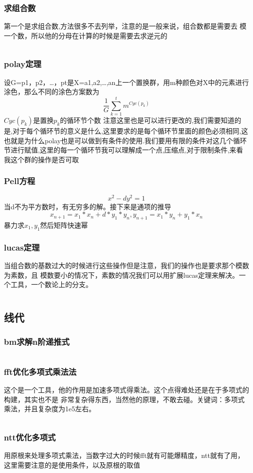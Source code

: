 \documentclass[a4paper,13.6pt]{article}
\begin{document}
\begin{CJK}{UTF8}{gbsn}
\subsubsection{求组合数}
第一个是求组合数,方法很多不去列举，注意的是一般来说，组合数都是需要去
模一个数，所以他的分母在计算的时候是需要去求逆元的
\inputminted{c++}{../scoure/math/zuhe.cpp}
\subsubsection{polay定理}
设G={p1，p2，…，pt}是X={a1,a2,…,an}上一个置换群，用m种颜色对X中的元素进行涂色，那么不同的涂色方案数为
$$\frac{1}{G}\sum_{k=1}^t m^{Cyc(p_k)}$$
$Cyc(p_k)$是置换$p_k$的循环节个数
注意这里也是可以进行更改的,我们需要知道的是,对于每个循环节的意义是什么,这里要求的是每个循环节里面的颜色必须相同,这也就是为什么polay也是可以做到有条件的使用.我们要用有限的条件对这几个循环节进行赋值,这里的每一个循环节我可以理解成一个点,压缩点,对于限制条件,来看我这个群的操作是否可取
\subsubsection{Pell方程}
$$x^2-dy^2=1$$
当d不为平方数时，有无穷多的解。接下来是通项的推导
$$ x_{n+1} = x_1*x_n+d*y_1*y_n,y_{n+1} = x_1*y_n + y_1*x_n $$
暴力求$x_1,y_1$然后矩阵快速幂
\subsubsection{lucas定理}
当组合数的基数过大的时候进行这些操作但是注意，我们的操作也是要求那个模数为素数，且
模数要小的情况下，素数的情况我们可以用扩展lucas定理来解决。一个工具，一个数论上的分支。
\inputminted{c++}{../scoure/math/lucas.cpp}
\subsection{线代}
\subsubsection{bm求解n阶递推式}
\inputminted{c++}{../scoure/math/bm.cpp}
\subsubsection{fft优化多项式乘法法}
这个是一个工具，他的作用是加速多项式得乘法。这个点得难处还是在于多项式的构建，其实也不是
非常复杂得东西，当然他的原理，不敢去碰。关键词：多项式乘法，并且复杂度为1e5左右。
\inputminted{c++}{../scoure/math/fft.cpp}
\subsubsection{ntt优化多项式}
用原根来处理多项式乘法，当数字过大的时候fft就有可能爆精度，ntt就有了用，这里需要注意的是使用条件，以及原根的取值
\inputminted{c++}{../scoure/math/ntt.cpp}

\end{CJK}
\end{document}
